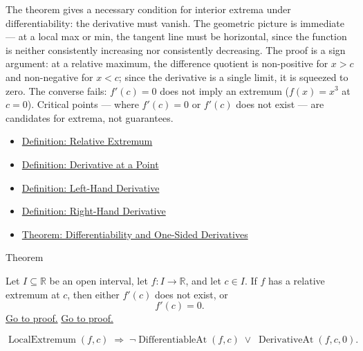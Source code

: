 \begin{remark*}[Interpretation]
The theorem gives a necessary condition for interior extrema under differentiability: the derivative must vanish. The geometric picture is immediate --- at a local max or min, the tangent line must be horizontal, since the function is neither consistently increasing nor consistently decreasing. The proof is a sign argument: at a relative maximum, the difference quotient is non-positive for $x > c$ and non-negative for $x < c$; since the derivative is a single limit, it is squeezed to zero. The converse fails: $f'(c) = 0$ does not imply an extremum ($f(x) = x^3$ at $c = 0$). Critical points --- where $f'(c) = 0$ or $f'(c)$ does not exist --- are candidates for extrema, not guarantees.
\end{remark*}

\begin{dependencies}
\begin{itemize}
  \item \hyperref[def:relative-extremum]{Definition: Relative Extremum}
  \item \hyperref[def:derivative-at-a-point]{Definition: Derivative at a Point}
  \item \hyperref[def:left-hand-derivative]{Definition: Left-Hand Derivative}
  \item \hyperref[def:right-hand-derivative]{Definition: Right-Hand Derivative}
  \item \hyperref[thm:differentiability-and-one-sided-derivatives]{Theorem: Differentiability and One-Sided Derivatives}
\end{itemize}
\end{dependencies}


\begin{theorembox}{Theorem}
\begin{theorem}
\label{thm:necessary-condition-extremum}
Let $I \subseteq \mathbb{R}$ be an open interval, let $f : I \to \mathbb{R}$, and let $c \in I$. If $f$ has a relative extremum at $c$, then either $f'(c)$ does not exist, or
\[
f'(c) = 0.
\]
\hyperref[prf:relative-extremum-derivatives-equal-0-or-dont-exist]{Go to proof.}
\hyperref[prf:necessary-condition-extremum]{Go to proof.}
\end{theorem}
\end{theorembox}

\begin{remark*}
\[
\operatorname{LocalExtremum}(f,c)
\;\Rightarrow\;
\lnot\operatorname{DifferentiableAt}(f,c) \;\lor\; \operatorname{DerivativeAt}(f,c,0).
\]
\end{remark*}


